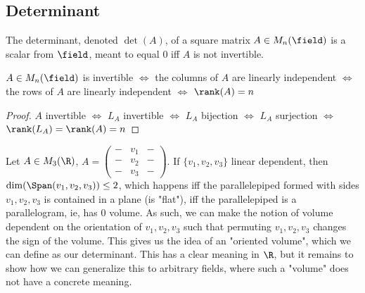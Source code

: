 
\subsection{Determinant}

The determinant, denoted $\det(A)$, of a square matrix $A \in M_n(\field)$ is a scalar from $\field$, meant to equal $0$ iff $A$ is not invertible.

\begin{proposition}
    $A \in M_{n}(\field)$ is invertible $\iff$ the columns of $A$  are linearly independent $\iff$ the rows of $A$  are linearly independent $\iff$ $\rank(A) = n$
\end{proposition}
\begin{proof}
    $A$ invertible $\iff$ $L_A$ invertible $\iff$ $L_A$ bijection $\iff$ $L_A$ surjection $\iff$ $\rank(L_A) = \rank(A) = n$
\end{proof}

\begin{example}
    Let $A \in M_3(\R)$, $A = \begin{pmatrix}
       - & v_1 & -\\
       - & v_2 & -\\
       - & v_3 & -
    \end{pmatrix}$. If $\{v_1, v_2, v_3\}$ linear dependent, then $\dim(\Span(v_1, v_2, v_3)) \leq 2$, which happens iff the parallelepiped formed with sides $v_1, v_2, v_3$ is contained in a plane (is "flat"), iff the parallelepiped is a parallelogram, ie, has 0 volume. As such, we can make the notion of volume dependent on the orientation of $v_1, v_2, v_3$ such that permuting $v_1, v_2, v_3$ changes the sign of the volume. This gives us the idea of an "oriented volume", which we can define as our determinant. This has a clear meaning in $\R$, but it remains to show how we can generalize this to arbitrary fields, where such a "volume" does not have a concrete meaning.
\end{example}

